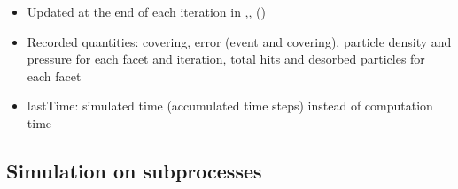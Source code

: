 \begin{itemize}[noitemsep,topsep=0pt, partopsep=0pt]
\item Updated at the end of each iteration in ,\linebreak[4] ,  ()
\item Recorded quantities: covering, error (event and covering), particle density and pressure for each facet and  iteration, total hits and desorbed particles for each facet
\item lastTime: simulated time (accumulated time steps) instead of computation time 
\end{itemize}

 \subsection{Simulation on subprocesses}
